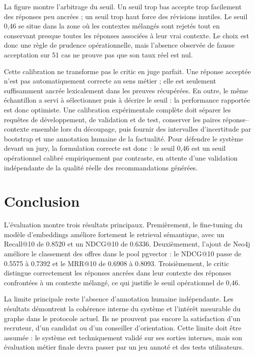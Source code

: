 \documentclass[12pt,twoside]{report}
\begin{document}
La figure montre l'arbitrage du seuil. Un seuil trop bas accepte trop facilement des réponses peu ancrées ; un seuil trop haut force des révisions inutiles. Le seuil 0,46 se situe dans la zone où les contextes mélangés sont rejetés tout en conservant presque toutes les réponses associées à leur vrai contexte. Le choix est donc une règle de prudence opérationnelle, mais l'absence observée de fausse acceptation sur 51 cas ne prouve pas que son taux réel est nul.

Cette calibration ne transforme pas le critic en juge parfait. Une réponse acceptée n'est pas automatiquement correcte au sens métier ; elle est seulement suffisamment ancrée lexicalement dans les preuves récupérées. En outre, le même échantillon a servi à sélectionner puis à décrire le seuil : la performance rapportée est donc optimiste. Une calibration expérimentale complète doit séparer les requêtes de développement, de validation et de test, conserver les paires réponse--contexte ensemble lors du découpage, puis fournir des intervalles d'incertitude par bootstrap et une annotation humaine de la factualité. Pour défendre le système devant un jury, la formulation correcte est donc : le seuil 0,46 est un seuil opérationnel calibré empiriquement par contraste, en attente d'une validation indépendante de la qualité réelle des recommandations générées.
\section*{Conclusion}
L'évaluation montre trois résultats principaux. Premièrement, le fine-tuning du modèle d'embeddings améliore fortement le retrieval sémantique, avec un Recall@10 de 0.8520 et un NDCG@10 de 0.6336. Deuxièmement, l'ajout de Neo4j améliore le classement des offres dans le pool pgvector : le NDCG@10 passe de 0.5575 à 0.7392 et le MRR@10 de 0.6908 à 0.8093. Troisièmement, le critic distingue correctement les réponses ancrées dans leur contexte des réponses confrontées à un contexte mélangé, ce qui justifie le seuil opérationnel de 0,46.

La limite principale reste l'absence d'annotation humaine indépendante. Les résultats démontrent la cohérence interne du système et l'intérêt mesurable du graphe dans le protocole actuel. Ils ne prouvent pas encore la satisfaction d'un recruteur, d'un candidat ou d'un conseiller d'orientation. Cette limite doit être assumée : le système est techniquement validé sur ses sorties internes, mais son évaluation métier finale devra passer par un jeu annoté et des tests utilisateurs.
\end{document}
